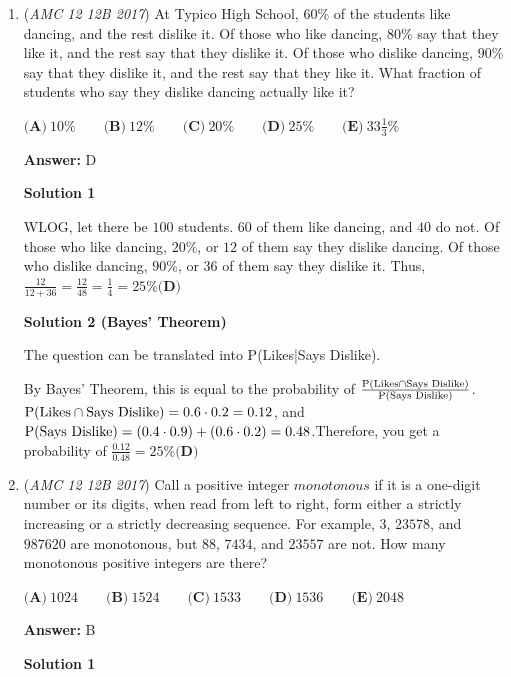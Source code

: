 \begin{enumerate}
 


	\item (\textit{AMC 12 12B 2017}) At Typico High School, $60\%$ of the students like dancing, and the rest dislike it. Of those who like dancing, $80\%$ say that they like it, and the rest say that they dislike it. Of those who dislike dancing, $90\%$ say that they dislike it, and the rest say that they like it. What fraction of students who say they dislike dancing actually like it?


 $\textbf{(A)}\ 10\%\qquad\textbf{(B)}\ 12\%\qquad\textbf{(C)}\ 20\%\qquad\textbf{(D)}\ 25\%\qquad\textbf{(E)}\ 33\frac{1}{3}\%$

 \textbf{Answer: }D



\textbf{Solution 1}

WLOG, let there be $100$ students. $60$ of them like dancing, and $40$ do not. Of those who like dancing, $20\%$, or $12$ of them say they dislike dancing. Of those who dislike dancing, $90\%$, or $36$ of them say they dislike it. Thus, $\frac{12}{12+36} = \frac{12}{48} = \frac{1}{4} = 25\% \boxed{\textbf{(D)}}$




\textbf{Solution 2 (Bayes' Theorem)}

The question can be translated into P(Likes|Says Dislike). 

 By Bayes' Theorem, this is equal to the probability of $\frac{\textnormal{P(Likes} \cap \textnormal{Says Dislike)}}{\textnormal{P(Says Dislike)}}$. $\textnormal{P(Likes} \cap \textnormal{Says Dislike)} = 0.6 \cdot 0.2 = 0.12$, and $\textnormal{P(Says Dislike)} = (0.4 \cdot 0.9) + (0.6 \cdot 0.2) = 0.48$.Therefore, you get a probability of $\frac{0.12}{0.48} = 25\% \boxed{\textbf{(D)}}$



	\item (\textit{AMC 12 12B 2017}) Call a positive integer $monotonous$ if it is a one-digit number or its digits, when read from left to right, form either a strictly increasing or a strictly decreasing sequence. For example, $3$, $23578$, and $987620$ are monotonous, but $88$, $7434$, and $23557$ are not. How many monotonous positive integers are there?


 $\textbf{(A)}\ 1024\qquad\textbf{(B)}\ 1524\qquad\textbf{(C)}\ 1533\qquad\textbf{(D)}\ 1536\qquad\textbf{(E)}\ 2048$

 \textbf{Answer: }B



\textbf{Solution 1}


\end{enumerate}
